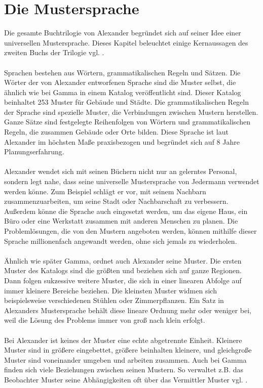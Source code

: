 \documentclass[fontsize=11pt,a4paper,final]{scrreprt}[2003/01/01]
\begin{document}
\section{Die Mustersprache}
Die gesamte Buchtrilogie von Alexander begründet sich auf seiner Idee einer universellen Mustersprache. Dieses Kapitel beleuchtet einige Kernaussagen des zweiten Buchs der Trilogie vgl. \cite[S. IX - XLIV]{Alexander1977}. \\ \\
Sprachen bestehen aus Wörtern, grammatikalischen Regeln und Sätzen. Die Wörter der von Alexander entworfenen Sprache sind die Muster selbst, die ähnlich wie bei Gamma in einem Katalog veröffentlicht sind. Dieser Katalog beinhaltet 253 Muster für Gebäude und Städte. Die grammatikalischen Regeln der Sprache sind spezielle Muster, die Verbindungen zwischen Mustern herstellen. Ganze Sätze sind festgelegte Reihenfolgen von Wörtern und grammatikalischen Regeln, die zusammen Gebäude oder Orte bilden. Diese Sprache ist laut Alexander im höchsten Maße praxisbezogen und begründet sich auf 8 Jahre Planungserfahrung. \\ \\
Alexander wendet sich mit seinen Büchern nicht nur an gelerntes Personal, sondern legt  nahe, dass seine universelle Mustersprache von Jedermann verwendet werden könne. Zum Beispiel schlägt er vor, mit seinem Nachbarn zusammenzuarbeiten, um seine Stadt oder Nachbarschaft zu verbessern. Außerdem könne die Sprache auch eingesetzt werden, um das eigene Haus, ein Büro oder eine Werkstatt zusammen mit anderen Menschen zu planen. Die Problemlösungen, die von den Mustern angeboten werden, können mithilfe dieser Sprache millionenfach angewandt werden, ohne sich jemals zu wiederholen. \\ \\
Ähnlich wie später Gamma, ordnet auch Alexander seine Muster. Die ersten Muster des Katalogs sind die größten und beziehen sich auf ganze Regionen. Dann folgen sukzessive weitere Muster, die sich in einer linearen Abfolge auf immer kleinere Bereiche beziehen. Die kleinsten Muster widmen sich beispielsweise verschiedenen Stühlen oder Zimmerpflanzen. Ein Satz in Alexanders Mustersprache behält diese lineare Ordnung mehr oder weniger bei, weil die Lösung des Problems immer von groß nach klein erfolgt. \\ \\
Bei Alexander ist keines der Muster eine echte abgetrennte Einheit. Kleinere Muster sind in größere eingebettet, größere beinhalten kleinere, und gleichgroße Muster sind voneinander umgeben und arbeiten zusammen. Auch bei Gamma finden sich viele Beziehungen zwischen seinen Mustern. So verwaltet z.B. das Beobachter Muster seine Abhängigkeiten oft über das Vermittler Muster vgl. \cite[S. 16]{gamma2004}. \\ \\
\end{document}
